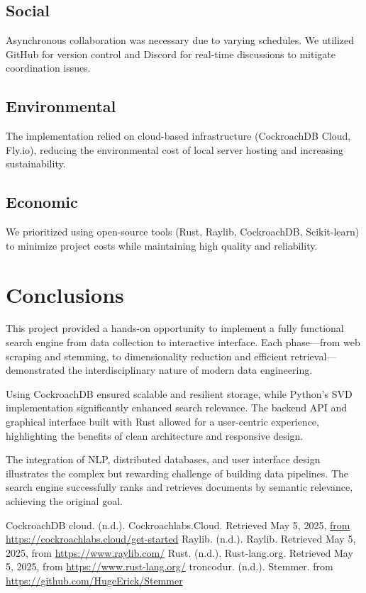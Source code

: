 \documentclass[twoside]{article}
\begin{document}
\subsection{Social}
Asynchronous collaboration was necessary due to varying schedules. We utilized GitHub for version control and Discord for real-time discussions to mitigate coordination issues.

\subsection{Environmental}
The implementation relied on cloud-based infrastructure (CockroachDB Cloud, Fly.io), reducing the environmental cost of local server hosting and increasing sustainability.

\subsection{Economic}
We prioritized using open-source tools (Rust, Raylib, CockroachDB, Scikit-learn) to minimize project costs while maintaining high quality and reliability.


\section{Conclusions}
This project provided a hands-on opportunity to implement a fully functional search engine from data collection to interactive interface. Each phase—from web scraping and stemming, to dimensionality reduction and efficient retrieval—demonstrated the interdisciplinary nature of modern data engineering.

Using CockroachDB ensured scalable and resilient storage, while Python’s SVD implementation significantly enhanced search relevance. The backend API and graphical interface built with Rust allowed for a user-centric experience, highlighting the benefits of clean architecture and responsive design.

The integration of NLP, distributed databases, and user interface design illustrates the complex but rewarding challenge of building data pipelines. The search engine successfully ranks and retrieves documents by semantic relevance, achieving the original goal.

\begin{thebibliography}{9}
  CockroachDB cloud. (n.d.). Cockroachlabs.Cloud. Retrieved May 5, 2025, \url{from https://cockroachlabs.cloud/get-started}
  Raylib. (n.d.). Raylib. Retrieved May 5, 2025, from \url{https://www.raylib.com/}
  Rust. (n.d.). Rust-lang.org. Retrieved May 5, 2025, from \url{https://www.rust-lang.org/}
  troncodur. (n.d.). Stemmer. from \url{https://github.com/HugeErick/Stemmer}
\end{thebibliography}
\end{document}
